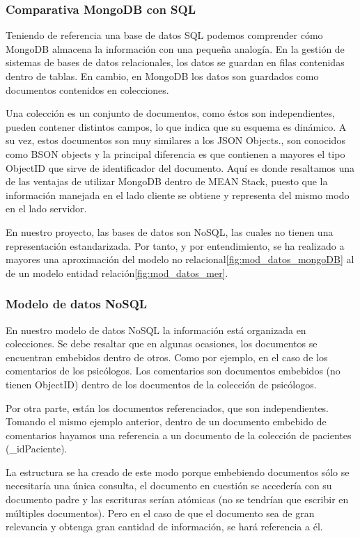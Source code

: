 \subsubsection{Comparativa MongoDB con SQL}
Teniendo de referencia una base de datos SQL podemos comprender cómo MongoDB almacena la información con una pequeña analogía. En la gestión de sistemas de bases de datos relacionales, los datos se guardan en filas contenidas dentro de tablas. En cambio, en MongoDB los datos son guardados como documentos contenidos en colecciones.


Una colección es un conjunto de documentos, como éstos son independientes, pueden contener distintos campos, lo que indica que su esquema es dinámico. A su vez, estos documentos son muy similares a los JSON Objects., son conocidos como BSON objects y la principal diferencia es que contienen a mayores el tipo ObjectID que sirve de identificador del documento. Aquí es donde resaltamos una de las ventajas de utilizar MongoDB dentro de MEAN Stack, puesto que la información manejada en el lado cliente se obtiene y representa del mismo modo en el lado servidor.


En nuestro proyecto, las bases de datos son NoSQL, las cuales no tienen una representación estandarizada. Por tanto, y por entendimiento, se ha realizado a mayores una aproximación del modelo no relacional\ref{fig:mod_datos_mongoDB} al de un modelo entidad relación\ref{fig:mod_datos_mer}.

\subsubsection{Modelo de datos NoSQL}
En nuestro modelo de datos NoSQL la información está organizada en colecciones. Se debe resaltar que en algunas ocasiones, los documentos se encuentran embebidos dentro de otros. Como por ejemplo, en el caso de los comentarios de los psicólogos. Los comentarios son documentos embebidos (no tienen ObjectID) dentro de los documentos de la colección de psicólogos.


Por otra parte, están los documentos referenciados, que son independientes. Tomando el mismo ejemplo anterior, dentro de un documento embebido de comentarios hayamos una referencia a un documento de la colección de pacientes (\_idPaciente).


La estructura se ha creado de este modo porque embebiendo documentos sólo se necesitaría una única consulta, el documento en cuestión se accedería con su documento padre y las escrituras serían atómicas (no se tendrían que escribir en múltiples documentos). Pero en el caso de que el documento sea de gran relevancia y obtenga gran cantidad de información, se hará referencia a él.


